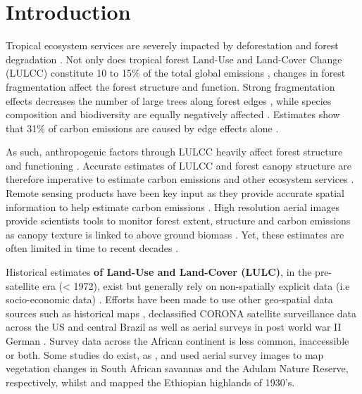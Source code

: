 \documentclass[remote sensing,article,submit,moreauthors,pdftex]{mdpi}
\begin{document}

\hypertarget{introduction}{%
\section{Introduction}\label{introduction}}

Tropical ecosystem services are severely impacted by deforestation and
forest degradation \citep{hansen2013, houghton2012, tyukavina2015}. Not
only does tropical forest Land-Use and Land-Cover Change (LULCC)
constitute 10 to 15\% of the total global emissions
\citep{vanderwerf2009}, changes in forest fragmentation affect the
forest structure and function. Strong fragmentation effects decreases
the number of large trees along forest edges
\citep{laurance2000, magnago2015}, while species composition and
biodiversity are equally negatively affected
\citep{poorter2006, barlow2016, vandeperre2018}. Estimates show that
31\% of carbon emissions are caused by edge effects alone
\citep{brinck2017}.

As such, anthropogenic factors through LULCC heavily affect forest
structure and functioning \citep{fauset2017, brinck2017, didham1999}.
Accurate estimates of LULCC and forest canopy structure are therefore
imperative to estimate carbon emissions and other ecosystem services
\citep{houghton2012, hansen2013}. Remote sensing products have been key
input as they provide accurate spatial information to help estimate
carbon emissions \citep{mitchard2018, hansen2013}. High resolution
aerial images provide scientists tools to monitor forest extent,
structure and carbon emissions as canopy texture is linked to above
ground biomass \citep{Ploton2012, Couteron2005, Barbier2010}. Yet, these
estimates are often limited in time to recent decades
\citep{defries2002, houghton2012, hansen2013, achard2014}.

Historical estimates \textbf{of Land-Use and Land-Cover (LULC)}, in the
pre-satellite era (\textless{} 1972), exist but generally rely on
non-spatially explicit data (i.e socio-economic data)
\citep{houghton2012, ramankutty1999, defries2002, sader1988}. Efforts
have been made to use other geo-spatial data sources such as historical
maps \citep{willcock2016}, declassified CORONA satellite surveillance
data across the US and central Brazil \citep{song2015} as well as aerial
surveys in post world war II German \citep{nita2018}. Survey data across
the African continent is less common, inaccessible or both. Some studies
do exist, as \citet{buitenwerf2012}, \citet{hudak1998} and
\citet{okeke2006} used aerial survey images to map vegetation changes in
South African savannas and the Adulam Nature Reserve, respectively,
whilst \citet{frankl2015} and \citet{nyssen2016} mapped the Ethiopian
highlands of 1930's.
\end{document}
